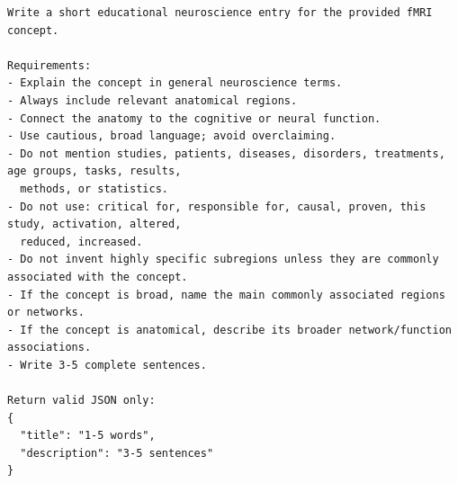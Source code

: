 \documentclass[11pt]{article}
\begin{document}
\begin{center}\begin{lrbox}{\revbox}\begin{minipage}{\dimexpr\linewidth-2\fboxsep-2\fboxrule\relax}\scriptsize
\begin{verbatim}
Write a short educational neuroscience entry for the provided fMRI concept.

Requirements:
- Explain the concept in general neuroscience terms.
- Always include relevant anatomical regions.
- Connect the anatomy to the cognitive or neural function.
- Use cautious, broad language; avoid overclaiming.
- Do not mention studies, patients, diseases, disorders, treatments, age groups, tasks, results,
  methods, or statistics.
- Do not use: critical for, responsible for, causal, proven, this study, activation, altered,
  reduced, increased.
- Do not invent highly specific subregions unless they are commonly associated with the concept.
- If the concept is broad, name the main commonly associated regions or networks.
- If the concept is anatomical, describe its broader network/function associations.
- Write 3-5 complete sentences.

Return valid JSON only:
{
  "title": "1-5 words",
  "description": "3-5 sentences"
}
\end{verbatim}
\end{minipage}\end{lrbox}\fbox{\usebox{\revbox}}\end{center}
\end{document}
